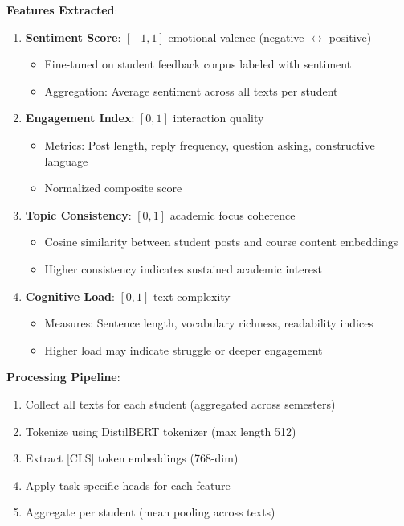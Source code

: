 \textbf{Features Extracted}:
\begin{enumerate}
\item \textbf{Sentiment Score}: $[-1, 1]$ emotional valence (negative $\leftrightarrow$ positive)
\begin{itemize}
\item Fine-tuned on student feedback corpus labeled with sentiment
\item Aggregation: Average sentiment across all texts per student
\end{itemize}

\item \textbf{Engagement Index}: $[0, 1]$ interaction quality
\begin{itemize}
\item Metrics: Post length, reply frequency, question asking, constructive language
\item Normalized composite score
\end{itemize}

\item \textbf{Topic Consistency}: $[0, 1]$ academic focus coherence
\begin{itemize}
\item Cosine similarity between student posts and course content embeddings
\item Higher consistency indicates sustained academic interest
\end{itemize}

\item \textbf{Cognitive Load}: $[0, 1]$ text complexity
\begin{itemize}
\item Measures: Sentence length, vocabulary richness, readability indices
\item Higher load may indicate struggle or deeper engagement
\end{itemize}
\end{enumerate}

\textbf{Processing Pipeline}:
\begin{enumerate}
\item Collect all texts for each student (aggregated across semesters)
\item Tokenize using DistilBERT tokenizer (max length 512)
\item Extract [CLS] token embeddings (768-dim)
\item Apply task-specific heads for each feature
\item Aggregate per student (mean pooling across texts)
\end{enumerate}

